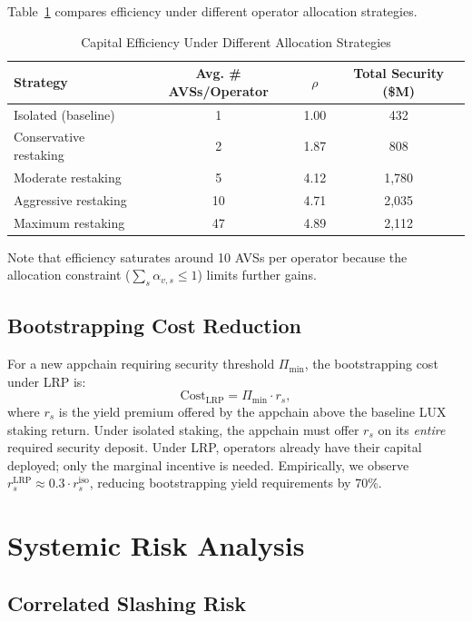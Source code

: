 \documentclass[11pt]{article}
\begin{document}
Table~\ref{tab:efficiency} compares efficiency under different operator allocation strategies.

\begin{table}[H]
\centering
\caption{Capital Efficiency Under Different Allocation Strategies}
\label{tab:efficiency}
\begin{tabular}{lccc}
\toprule
\textbf{Strategy} & \textbf{Avg. \# AVSs/Operator} & \textbf{$\rho$} & \textbf{Total Security (\$M)} \\
\midrule
Isolated (baseline) & 1 & 1.00 & 432 \\
Conservative restaking & 2 & 1.87 & 808 \\
Moderate restaking & 5 & 4.12 & 1,780 \\
Aggressive restaking & 10 & 4.71 & 2,035 \\
Maximum restaking & 47 & 4.89 & 2,112 \\
\bottomrule
\end{tabular}
\end{table}

Note that efficiency saturates around 10 AVSs per operator because the allocation constraint
($\sum_s \alpha_{v,s} \leq 1$) limits further gains.

\subsection{Bootstrapping Cost Reduction}

For a new appchain requiring security threshold $\Pi_{\min}$, the bootstrapping cost under
LRP is:
\[
  \text{Cost}_{\text{LRP}} = \Pi_{\min} \cdot r_s,
\]
where $r_s$ is the yield premium offered by the appchain above the baseline LUX staking
return. Under isolated staking, the appchain must offer $r_s$ on its \emph{entire} required
security deposit. Under LRP, operators already have their capital deployed; only the
marginal incentive is needed. Empirically, we observe $r_s^{\text{LRP}} \approx 0.3
\cdot r_s^{\text{iso}}$, reducing bootstrapping yield requirements by 70\%.

\section{Systemic Risk Analysis}
\label{sec:risk}

\subsection{Correlated Slashing Risk}
\end{document}
